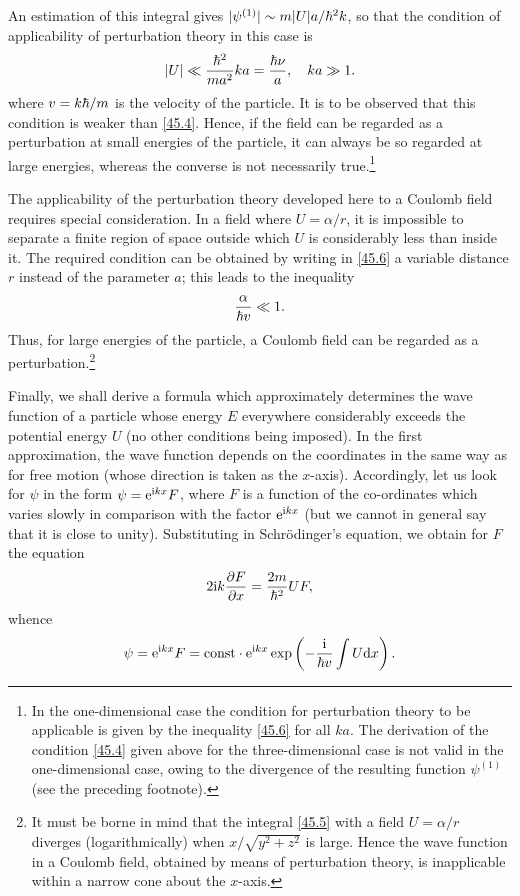 An estimation of this integral gives $ |\psi^{(1)}| \sim m|U|a/\hbar^2k $, so that the condition of applicability of perturbation theory in this case is
\begin{equation}\label{45.6}
|U|\ll\frac{\hbar^2}{ma^2}ka=\frac{\hbar\nu}{a},\quad ka\gg1.
\end{equation}
where $ v = k\hbar/m $ is the velocity of the particle. It is to be observed that this condition is weaker than \eqref{45.4}. Hence, if the field can be regarded as a perturbation at small energies of the particle, it can always be so regarded at large energies, whereas the converse is not necessarily true.\footnote{In the one-dimensional case the condition for perturbation theory to be applicable is given by the inequality \eqref{45.6} for all $ ka $. The derivation of the condition \eqref{45.4} given above for the three-dimensional case is not valid in the one-dimensional case, owing to the divergence of the resulting function $ \psi^{(1)} $ (see the preceding footnote).
}

The applicability of the perturbation theory developed here to a Coulomb field requires special consideration. In a field where $ U = \alpha/r $, it is impossible to separate a finite region of space outside which $ U $ is considerably less than inside it. The required condition can be obtained by writing in \eqref{45.6} a variable distance $ r $ instead of the parameter $ a $; this leads to the inequality
\begin{equation}\label{45.7}
\frac{\alpha}{\hbar v}\ll1.
\end{equation}
Thus, for large energies of the particle, a Coulomb field can be regarded as a perturbation.\footnote{It must be borne in mind that the integral \eqref{45.5} with a field $ U = \alpha/r $ diverges (logarithmically) when $ x/\sqrt{y^2 + z^2} $ is large. Hence the wave function in a Coulomb field, obtained by means of perturbation theory, is inapplicable within a narrow cone about the $ x $-axis.}

Finally, we shall derive a formula which approximately determines the wave function of a particle whose energy $ E $ everywhere considerably exceeds the potential energy $ U $ (no other conditions being imposed). In the first approximation, the wave function depends on the coordinates in the same way as for free motion (whose direction is taken as the $ x $-axis). Accordingly, let us look for $\psi$ in the form $ \psi= \mathrm{e}^{\mathrm{i} kx}F $, where $ F $ is a function of the co-ordinates which varies slowly in comparison with the factor $ \mathrm{e}^{\mathrm{i} kx} $ (but we cannot in general say that it is close to unity). Substituting in Schr\"odinger’s equation, we obtain for $ F $ the equation
\begin{equation}\label{45.8}
2\mathrm{i} k\frac{\partial F}{\partial x}=\frac{2m}{\hbar^2}UF,
\end{equation}
whence
\begin{equation}\label{45.9}
\psi=\mathrm{e}^{\mathrm{i} kx}F=\mathrm{const}\cdot\mathrm{e}^{\mathrm{i} kx}\exp\left(-\frac{\mathrm{i}}{\hbar v}\int U\mathrm{d} x \right).
\end{equation}



